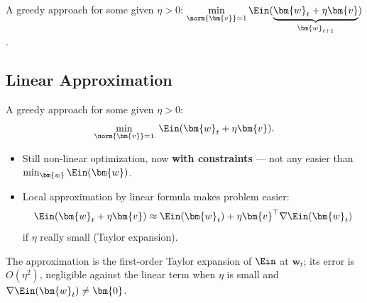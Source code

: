 \begin{moral}
    A greedy approach for some given \(\eta > 0\):
    \(\displaystyle \min_{\norm{\bm{v}} = 1} \Ein(\underbrace{\bm{w}_t + \eta
    \bm{v}}_{\bm{w}_{t+1}})\).
\end{moral}

\subsection{Linear Approximation}

A greedy approach for some given \(\eta > 0\):
\[
    \min_{\norm{\bm{v}} = 1} \; \Ein(\bm{w}_t + \eta \bm{v}) .
\]
\begin{itemize}
    \item Still non-linear optimization, now \textbf{with constraints} --- not
        any easier than \(\min_{\bm{w}} \Ein(\bm{w})\).
    \item Local approximation by linear formula makes problem easier:
        \[
            \Ein(\bm{w}_t + \eta \bm{v}) \approx \Ein(\bm{w}_t) + \eta
            \bm{v}^\top \nabla \Ein(\bm{w}_t)
        \]
        if \(\eta\) really small (Taylor expansion).
\end{itemize}

The approximation is the first-order Taylor expansion of \(\Ein\) at
\(\bm{w}_t\); its error is \(O(\eta^2)\), negligible against the linear term
when \(\eta\) is small and \(\nabla \Ein(\bm{w}_t) \neq \bm{0}\).

